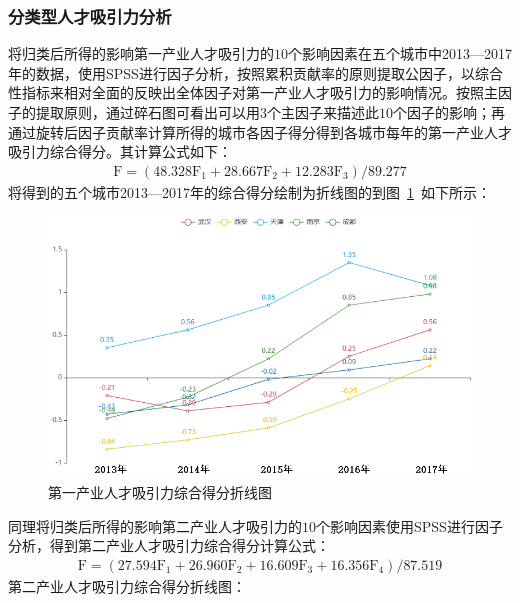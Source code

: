 \documentclass{whutmod}
\begin{document}
	
	\subsubsection{分类型人才吸引力分析}
	将归类后所得的影响第一产业人才吸引力的$10$个影响因素在五个城市中2013—2017年的数据，使用SPSS进行因子分析，按照累积贡献率的原则提取公因子，以综合性指标来相对全面的反映出全体因子对第一产业人才吸引力的影响情况。按照主因子的提取原则，通过碎石图可看出可以用$3$个主因子来描述此$10$个因子的影响；再通过旋转后因子贡献率计算所得的城市各因子得分得到各城市每年的第一产业人才吸引力综合得分。其计算公式如下：
	\begin{gather}
	\mathrm { F } = \left( 48.328 \mathrm { F } _ { 1 } + 28.667 \mathrm { F } _ { 2 } + 12.283 \mathrm { F } _ { 3 } \right) / 89.277
	\end{gather}
	将得到的五个城市2013—2017年的综合得分绘制为折线图的到图~\ref{11}~如下所示：
	\begin{figure}[H]
		\centering
		\includegraphics[width=\textwidth]{figures/11.png}
		\caption{第一产业人才吸引力综合得分折线图}\label{11}
	\end{figure} 
	同理将归类后所得的影响第二产业人才吸引力的$10$个影响因素使用SPSS进行因子分析，得到第二产业人才吸引力综合得分计算公式：
	\begin{gather}
	\mathrm { F } = \left( 27.594 \mathrm { F } _ { 1 } + 26.960 \mathrm { F } _ { 2 } + 16.609 \mathrm { F } _ { 3 } + 16.356 \mathrm { F } _ { 4 } \right) / 87.519
	\end{gather}
	第二产业人才吸引力综合得分折线图：
\end{document}

